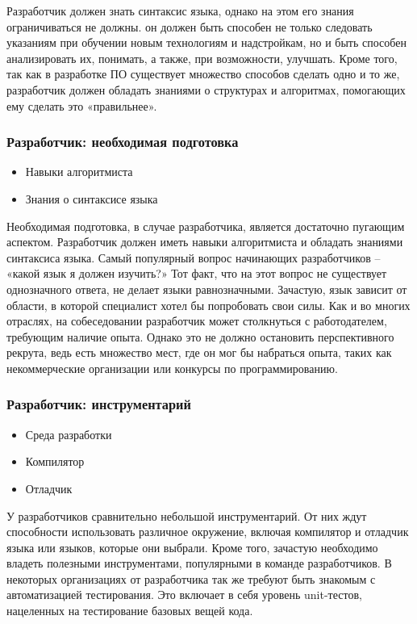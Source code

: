 \documentclass{../industrial-development}
\begin{document}
\lecturenotes

Разработчик должен знать синтаксис языка, однако на этом его знания ограничиваться не должны. он должен быть способен не только следовать указаниям при обучении новым технологиям и надстройкам, но и быть способен анализировать их, понимать, а также, при возможности, улучшать. Кроме того, так как в разработке ПО существует множество способов сделать одно и то же, разработчик должен обладать знаниями о структурах и алгоритмах, помогающих ему сделать это «правильнее».   ~\cite{Anatomy}

\begin{frame} \frametitle{Разработчик: необходимая подготовка}
  \begin{itemize}
	\item Навыки алгоритмиста 
	\item Знания о синтаксисе языка
	\end{itemize}
\end{frame}

\lecturenotes

Необходимая подготовка, в случае разработчика, является достаточно пугающим аспектом. Разработчик должен иметь навыки алгоритмиста и обладать знаниями синтаксиса языка. Самый популярный вопрос начинающих разработчиков – «какой язык я должен изучить?» Тот факт, что на этот вопрос не существует однозначного ответа, не делает языки равнозначными. Зачастую, язык зависит от области, в которой специалист хотел бы попробовать свои силы. 
Как и во многих отраслях, на собеседовании разработчик может столкнуться с работодателем, требующим наличие опыта. Однако это не должно остановить перспективного рекрута, ведь есть множество мест, где он мог бы набраться опыта, таких как некоммерческие организации или конкурсы по программированию. 
 ~\cite{Anatomy}

\begin{frame} \frametitle{Разработчик: инструментарий}
  \begin{itemize}
	\item Среда разработки
	\item Компилятор
	\item Отладчик
	\end{itemize}
\end{frame}

\lecturenotes

У разработчиков сравнительно небольшой инструментарий. От них ждут способности использовать различное окружение, включая компилятор и отладчик языка или языков, которые они выбрали. Кроме того, зачастую необходимо владеть полезными инструментами, популярными в команде разработчиков. 
В некоторых организациях от разработчика так же требуют быть знакомым с автоматизацией тестирования. Это включает в себя уровень unit-тестов, нацеленных на тестирование базовых вещей кода. 
  ~\cite{Anatomy}
\end{document}
